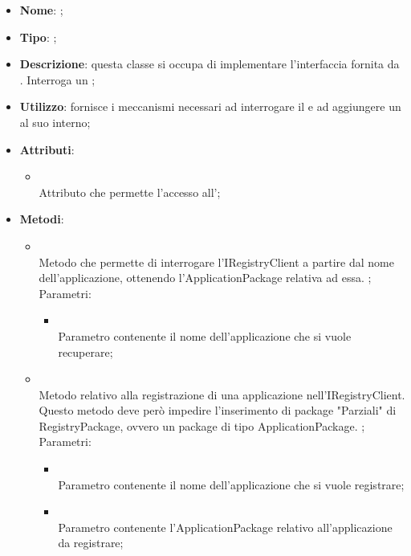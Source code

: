\begin{itemize}
	\item \textbf{Nome}: ;
	\item \textbf{Tipo}: ;
	\item \textbf{Descrizione}: questa classe si occupa di implementare l'interfaccia fornita da . Interroga un ;
	\item \textbf{Utilizzo}: fornisce i meccanismi necessari ad interrogare il  e ad aggiungere un  al suo interno;
	\item \textbf{Attributi}:
	\begin{itemize}
		\item[]  \\
		Attributo che permette l'accesso all';
	\end{itemize}
	\item \textbf{Metodi}:
	\begin{itemize}
		\item[]  \\
		Metodo che permette di interrogare l'IRegistryClient a partire dal nome dell'applicazione, ottenendo l'ApplicationPackage relativa ad essa. ;\\
		Parametri:
		\begin{itemize}
			\item {} \\
			Parametro contenente il nome dell'applicazione che si vuole recuperare;
		\end{itemize}
		\item[]  \\
		Metodo relativo alla registrazione di una applicazione nell'IRegistryClient.
Questo metodo deve però impedire l'inserimento di package "Parziali" di RegistryPackage, ovvero un package di tipo ApplicationPackage. ;\\
		Parametri:
		\begin{itemize}
			\item {} \\
			Parametro contenente il nome dell'applicazione che si vuole registrare;
			\item {} \\
			Parametro contenente l'ApplicationPackage relativo all'applicazione da registrare;

\end{itemize}
\end{itemize}
\end{itemize}
